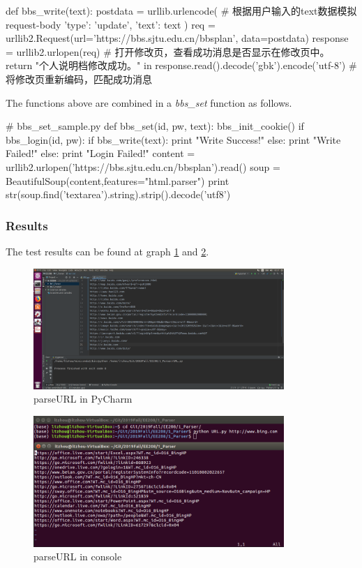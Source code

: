 \documentclass{article}
\begin{document}
\begin{python}
def bbs_write(text):
    postdata = urllib.urlencode({    # 根据用户输入的text数据模拟request-body
        'type': 'update',
        'text': text
    })
    req = urllib2.Request(url='https://bbs.sjtu.edu.cn/bbsplan', data=postdata)
    response = urllib2.urlopen(req)  # 打开修改页，查看成功消息是否显示在修改页中。
    return "个人说明档修改成功。" in response.read().decode('gbk').encode('utf-8')
                                     # 将修改页重新编码，匹配成功消息
\end{python}

The functions above are combined in a \textit{bbs\_set} function as follows.
\begin{python}
# bbs_set_sample.py
def bbs_set(id, pw, text):
    bbs_init_cookie()
    if bbs_login(id, pw):
        if bbs_write(text):
            print "Write Success!"
        else:
            print "Write Failed!"
    else:
        print "Login Failed!"
    content = urllib2.urlopen('https://bbs.sjtu.edu.cn/bbsplan').read()
    soup = BeautifulSoup(content,features="html.parser")
    print str(soup.find('textarea').string).strip().decode('utf8')
\end{python}

\subsubsection{Results}
The test results can be found at graph \ref{img:1.1} and \ref{img:1.2}.

\begin{figure}[htbp]
\centering
\includegraphics[width=9.5cm]{img/test1_1.png}
\caption{parseURL in PyCharm}
\label{img:1.1}
\end{figure}

\begin{figure}[htbp]
\centering
\includegraphics[width=9.5cm]{img/test1_2.png}
\caption{parseURL in console}
\label{img:1.2}
\end{figure}
\end{document}
